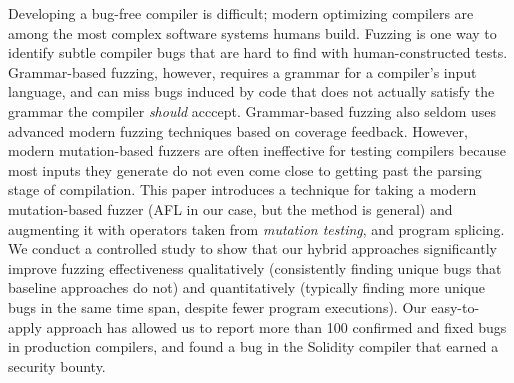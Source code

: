 Developing a bug-free compiler is difficult; modern optimizing compilers are among the most complex software systems humans build.  Fuzzing is one way to identify subtle compiler bugs that are hard to find with human-constructed tests.  Grammar-based fuzzing, however, requires a grammar for a compiler's input language, and can miss bugs induced by code that does not actually satisfy the grammar the compiler \emph{should} acccept.  Grammar-based fuzzing also seldom uses advanced modern fuzzing techniques based on coverage feedback. However, modern mutation-based fuzzers are often ineffective for testing compilers because most inputs they generate do not even come close to getting past the parsing stage of compilation.   This paper introduces a technique for taking a modern mutation-based fuzzer (AFL in our case, but the method is general) and augmenting it with operators taken from \emph{mutation testing}, and program splicing. We conduct a controlled study to show that our hybrid approaches significantly improve fuzzing effectiveness qualitatively (consistently finding unique bugs that baseline approaches do not) and quantitatively (typically finding more unique bugs in the same time span, despite fewer program executions). Our easy-to-apply approach has allowed us to report more than 100 confirmed and fixed bugs in production compilers, and found a bug in the Solidity compiler that earned a security bounty.  